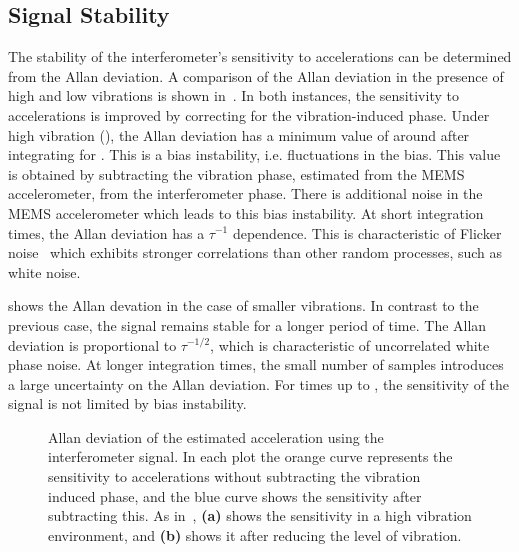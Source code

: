 \subsection{Signal Stability}\label{subsec:stability}	
The stability of the interferometer's sensitivity to accelerations can
be determined from the Allan deviation. A comparison of the
Allan deviation in the presence of high and low vibrations is shown
in~. In both instances, the sensitivity
to accelerations is improved by correcting for the vibration-induced
phase. Under high vibration (), the Allan deviation has a minimum value
of around  after integrating for
. This is a bias instability, i.e. fluctuations in
the bias. This value is obtained by subtracting the vibration
phase, estimated from the MEMS accelerometer, from the interferometer
phase. There is additional noise in the MEMS
accelerometer which leads to this bias instability. At short
integration times, the Allan deviation has a $\tau^{-1}$
dependence. This is characteristic of Flicker noise~\cite{Masry1991}
which exhibits stronger correlations than other random processes, such
as white noise.  
\par\noindent
{} shows the Allan devation in the case of
smaller vibrations. In contrast to the previous case, the signal
remains stable for a longer period of time. The Allan deviation
is proportional to \(\tau^{-1/2}\), which is characteristic of
uncorrelated white phase noise. At longer integration times, the
small number of samples introduces a large uncertainty on the Allan
deviation. For times up to , 
the sensitivity of the signal is not limited by bias
instability. 
\begin{figure}[htpb!]
  \centering
  \caption[Comparison of Allan deviation in a high and
    low vibration
  environment.]{Allan deviation of the estimated acceleration using
    the interferometer signal. In each plot the orange curve
    represents the sensitivity to accelerations without subtracting
    the vibration induced phase, and the blue curve shows the
    sensitivity after subtracting this. 
    As in~, \textbf{(a)} shows
    the sensitivity in a high vibration environment, and
    \textbf{(b)} shows it after reducing the level of vibration.}
  \label{fig:adev_comparison}
\end{figure}

